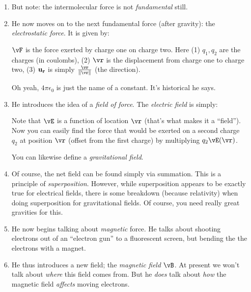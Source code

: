 \begin{enumerate}
  \item But note: the intermolecular force is not \emph{fundamental}
  still.

  \item He now moves on to the next fundamental force (after gravity):
  the \emph{electrostatic force}. It is given by:

  \begin{nedqn}
    \vF
  \eqcol
    \vecu[r]
  \end{nedqn}

  $\vF$ is the force exerted by charge one on charge two. Here (1) $q_1,
  q_2$ are the charges (in coulombs), (2) $\vr$ is the displacement from
  charge one to charge two, (3) $\vecu[r]$ is simply
  $\frac{\vr}{\norm{\vr}}$ (the direction).

  Oh yeah, $4 \pi \epsilon_0$ is just the name of a constant. It's
  historical he says.

  \item He introduces the idea of a \emph{field of force}. The
  \emph{electric field} is simply:

  \begin{nedqn}
    \vE
  \eqcol
    \vecu[r]
  \end{nedqn}

  Note that $\vE$ is a function of location $\vr$ (that's what makes it
  a ``field'').  Now you can easily find the force that would be exerted
  on a second charge $q_2$ at position $\vr$ (offset from the first
  charge) by multiplying $q_2 \vE(\vr)$.

  You can likewise define a \emph{gravitational field}.

  \item Of course, the net field can be found simply via summation. This
  is a principle of \emph{superposition}. However, while superposition
  appears to be exactly true for electrical fields, there is some
  breakdown (because relativity) when doing superposition for
  gravitational fields. Of course, you need really great gravities for
  this.

  \item He now begins talking about \emph{magnetic} force. He talks
  about shooting electrons out of an ``electron gun'' to a fluorescent
  screen, but bending the the electrons with a magnet.

  \item He thus introduces a new field; the \emph{magnetic field}
  $\vB$. At present we won't talk about \emph{where} this field comes
  from. But he \emph{does} talk about \emph{how} the magnetic field
  \emph{affects} moving electrons.


\end{enumerate}
